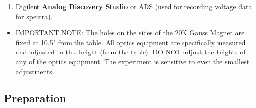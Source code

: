 \documentclass{../lab}
\begin{document}
\begin{enumerate}


    \item Digilent \href{https://digilent.com/shop/analog-discovery-studio/}{\textbf{Analog Discovery Studio}} or ADS (used for recording voltage data for spectra).


\end{enumerate}

\begin{itemize}
    \item IMPORTANT NOTE: The holes on the sides of the 20K Gauss Magnet are fixed at 10.5" from the table. All optics equipment are specifically measured and adjusted to this height (from the table). DO NOT adjust the heights of any of the optics equipment. The experiment is sensitive to even the smallest adjustments.

\end{itemize}

\subsection{Preparation}
\end{document}

